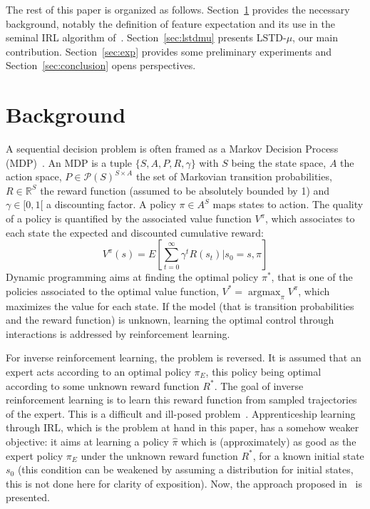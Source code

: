 \documentclass{jfpda2011}
\newcommand{\argmax}{\operatorname*{argmax}} %
\begin{document}
The rest of this paper is organized as follows.
Section~\ref{sec:back} provides the necessary background,
notably the definition of feature expectation and its use in the
seminal IRL algorithm of~\citet{abbeel2004apprenticeship}.
Section~\ref{sec:lstdmu} presents LSTD-$\mu$, our main contribution.
Section~\ref{sec:exp} provides some preliminary experiments and
Section~\ref{sec:conclusion} opens perspectives.


\section{Background}
\label{sec:back}
A sequential decision problem is often framed as a Markov Decision
Process (MDP)~\citep{puterman1994markov}. An MDP is a tuple
$\{S,A,P,R,\gamma\}$ with $S$ being the state space, $A$ the action
space, $P\in\mathcal{P}(S)^{S\times A}$ the set of Markovian
transition probabilities, $R\in\mathbb{R}^S$ the reward function
(assumed to be absolutely bounded by 1) and $\gamma\in[0,1[$ a
discounting factor. A policy $\pi\in A^S$ maps states to action. The
quality of a policy is quantified by the associated value function
$V^\pi$, which associates to each state the expected and discounted
cumulative reward:
\begin{equation}
  V^\pi(s) = E[\sum_{t=0}^\infty \gamma^t R(s_t)|s_0=s, \pi]
\end{equation}
Dynamic programming aims at finding the optimal policy $\pi^*$, that
is one of the policies associated to the optimal value function,
$V^* = \argmax_\pi V^\pi$, which maximizes the value for each state.
If the model (that is transition probabilities and the reward
function) is unknown, learning the optimal control through
interactions is addressed by reinforcement learning.

For inverse reinforcement learning, the problem is reversed. It is
assumed that an expert acts according to an optimal policy $\pi_E$,
this policy being optimal according to some unknown reward function
$R^*$. The goal of inverse reinforcement learning is to learn this
reward function from sampled trajectories of the expert. This is a
difficult and ill-posed problem~\citep{ng2000algorithms}. Apprenticeship
learning through IRL, which is the problem at hand in this paper,
has a somehow weaker objective: it aims at learning a policy
$\hat{\pi}$ which is (approximately) as good as the expert policy
$\pi_E$ under the unknown reward function $R^*$, for a known initial
state $s_0$ (this condition can be weakened by assuming a
distribution for initial states, this is not done here for clarity
of exposition). Now, the approach proposed in~\citep{abbeel2004apprenticeship} is
presented.
\end{document}
